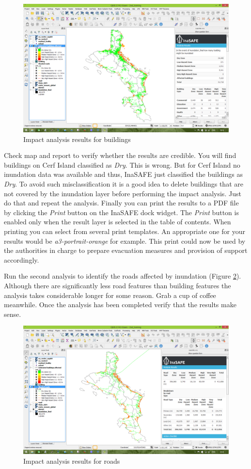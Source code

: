 \documentclass[a4paper,12pt,titlepage]{article}
\begin{document}
\begin{figure}[htb]
	\centering
	\includegraphics[width=12cm]{Images/analysis2.png}
	\caption{Impact analysis results for buildings}\label{fig:analysis2}
\end{figure}

Check map and report to verify whether the results are credible.
You will find buildings on Cerf Island classified as \textit{Dry}. This is wrong. But for Cerf Island no inundation data was available and thus, InaSAFE just classified the buildings as \textit{Dry}. To avoid such misclassification it is a good idea to delete buildings that are not covered by the inundation layer before performing the impact analysis. Just do that and repeat the analysis. Finally you can print the results to a PDF file by clicking the \textit{Print} button on the InaSAFE dock widget. The \textit{Print} button is enabled only when the result layer is selected in the table of contents. When printing you can select from several print templates. An appropriate one for your results would be \textit{a3-portrait-orange} for example. This print could now be used by the authorities in charge to prepare evacuation measures and provision of support accordingly. 

Run the second analysis to identify the roads affected by inundation (Figure \ref{fig:analysis3}). Although there are significantly less road features than building features the analysis takes considerable longer for some reason. Grab a cup of coffee meanwhile. Once the analysis has been completed verify that the results make sense.

\begin{figure}[htb]
	\centering
	\includegraphics[width=12cm]{Images/analysis3.png}
	\caption{Impact analysis results for roads}\label{fig:analysis3}
\end{figure}
\end{document}
